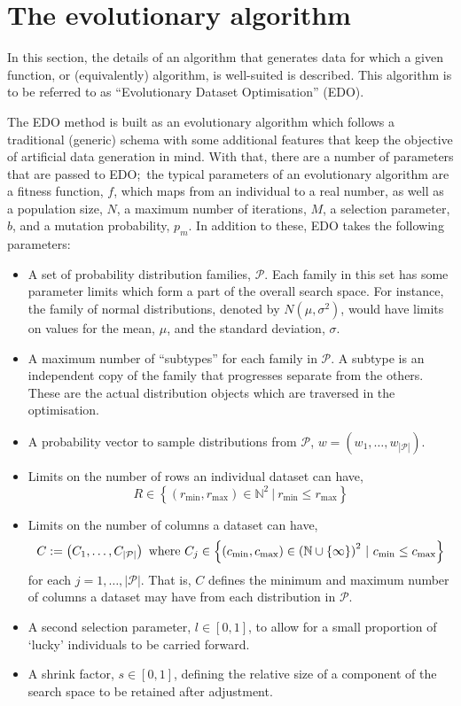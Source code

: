 \section{The evolutionary algorithm}\label{section:algorithm}

In this section, the details of an algorithm that generates data for which a
given function, or (equivalently) algorithm, is well-suited is described. This
algorithm is to be referred to as ``Evolutionary Dataset Optimisation'' (EDO).

The EDO method is built as an evolutionary algorithm which follows a traditional
(generic) schema with some additional features that keep the objective of
artificial data generation in mind. With that, there are a number of parameters
that are passed to EDO;\ the typical parameters of an evolutionary algorithm
are a fitness function, \(f\), which maps from an individual to a real number,
as well as a population size, \(N\), a maximum number of iterations, \(M\), a
selection parameter, \(b\), and a  mutation probability, \(p_m\). In addition to
these, EDO takes the following parameters:
\begin{itemize}
    \item A set of probability distribution families, \(\mathcal{P}\). Each
        family in this set has some parameter limits which form a part of the
        overall search space. For instance, the family of normal distributions,
        denoted by \(N(\mu, \sigma^2)\), would have limits on values for the
        mean, \(\mu\), and the standard deviation, \(\sigma\).
    \item A maximum number of ``subtypes'' for each family in \(\mathcal{P}\). A
        subtype is an independent copy of the family that progresses separate
        from the others. These are the actual distribution objects which are
        traversed in the optimisation.
    \item A probability vector to sample distributions from \(\mathcal{P}\),
        \(w = \left(w_1, \ldots, w_{|\mathcal{P}|}\right)\).
    \item Limits on the number of rows an individual dataset can have,
        \[
            R \in \left\{%
                (r_{\min}, r_{\max}) \in \mathbb{N}^2~|~r_{\min} \leq r_{\max}
            \right\}
        \]
    \item Limits on the number of columns a dataset can have,
        \[
            C := \left(C_1, \ldots, C_{|\mathcal{P}|}\right)
            \text{ where }
            C_j \in \left\{ (c_{\min}, c_{\max}) \in {%
                \left(\mathbb{N}\cup\{\infty\}\right)
            }^2~|~c_{\min} \leq c_{\max}\right\}
        \]
        for each \(j = 1, \ldots, |\mathcal{P}|\). That is, \(C\) defines the
        minimum and maximum number of columns a dataset may have from each
        distribution in \(\mathcal{P}\).
    \item A second selection parameter, \(l \in [0, 1]\), to allow for a
        small proportion of `lucky' individuals to be carried forward.
    \item A shrink factor, \(s \in [0, 1]\), defining the relative size of a
        component of the search space to be retained after adjustment.
\end{itemize}

